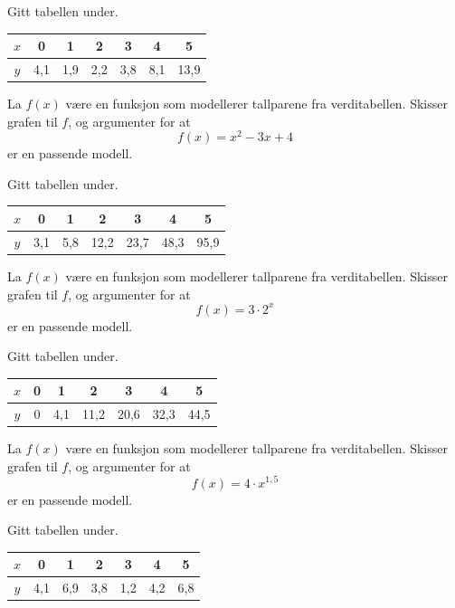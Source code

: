Gitt tabellen under.

\begin{center}
	\small
	\begin{tabular}{|c|c|c|c|c|c|c|}
		$x$ & 0 & 1 & 2 & 3 & 4 & 5 \\
		\hline
		$y$ & 4{,}1 & 1{,}9 & 2{,}2 & 3{,}8 & 8{,}1 & 13{,}9
	\end{tabular}
\end{center}

\vspace{1em}

La $f(x)$ være en funksjon som modellerer tallparene fra verditabellen. Skisser grafen til $f$, og argumenter for at
\[
f(x) = x^2 - 3x + 4
\]
er en passende modell.

Gitt tabellen under.

\begin{center}
	\small
	\begin{tabular}{|c|c|c|c|c|c|c|}
		$x$ & 0 & 1 & 2 & 3 & 4 & 5 \\
		\hline
		$y$ & 3{,}1 & 5{,}8 & 12{,}2 & 23{,}7 & 48{,}3 & 95{,}9
	\end{tabular}
\end{center}

\vspace{1em}

La $f(x)$ være en funksjon som modellerer tallparene fra verditabellen. Skisser grafen til $f$, og argumenter for at
\[
f(x) = 3 \cdot 2^x
\]
er en passende modell.

Gitt tabellen under.

\begin{center}
	\small
	\begin{tabular}{|c|c|c|c|c|c|c|}
		$x$ & 0 & 1 & 2 & 3 & 4 & 5 \\
		\hline
		$y$ & 0 & 4{,}1 & 11{,}2 & 20{,}6 & 32{,}3 & 44{,}5
	\end{tabular}
\end{center}

\vspace{1em}

La $f(x)$ være en funksjon som modellerer tallparene fra verditabellen. Skisser grafen til $f$, og argumenter for at
\[
f(x) = 4 \cdot x^{1{,}5}
\]
er en passende modell.

Gitt tabellen under.

\begin{center}
	\small
	\begin{tabular}{|c|c|c|c|c|c|c|}
		$x$ & 0 & 1 & 2 & 3 & 4 & 5 \\
		\hline
		$y$ & 4{,}1 & 6{,}9 & 3{,}8 & 1{,}2 & 4{,}2 & 6{,}8
	\end{tabular}
\end{center}

